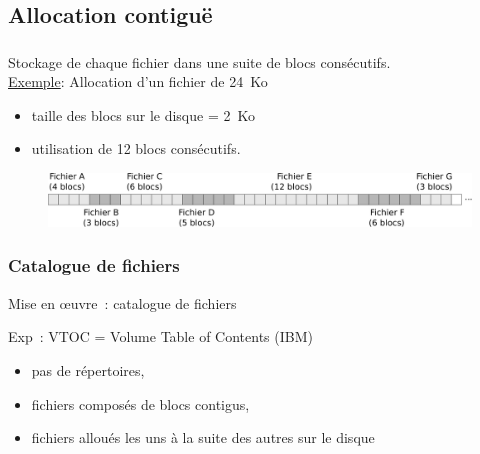 \subsection{Allocation contiguë}
\begin{frame}
  \frametitle{\insertsubsection}
  Stockage de chaque fichier dans une \alert{suite de blocs consécutifs}.\\
  \vspace{0.5cm}
  \underline{Exemple}: Allocation d'un fichier de 24~Ko
  \begin{itemize}
  \item taille des blocs sur le disque = 2~Ko  
  \item[\ding{212}] utilisation de 12 blocs consécutifs. 
  \end{itemize}
  
  \begin{figure}[h]
    \center
    \includegraphics[width=\linewidth]{fig4/alloc_contigue}
  \end{figure}
  \vspace{0.5cm}
\end{frame}

\begin{frame}
  \frametitle{Catalogue de fichiers}
  Mise en \oe{}uvre~: \alert{catalogue de fichiers}
  \vspace{0.5cm}

  Exp~: VTOC = Volume Table of Contents (IBM)
  \begin{itemize}
  \item pas de répertoires, 
  \item fichiers composés de blocs contigus, 
  \item fichiers alloués les uns à la suite des autres sur le disque
  \end{itemize}
\end{frame}

